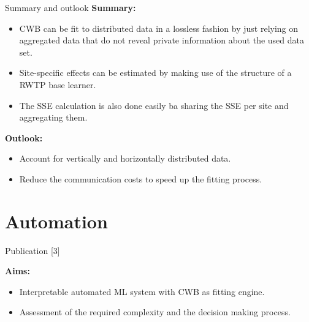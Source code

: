 \documentclass[t,10pt]{beamer}
\begin{document}
\begin{frame}{Summary and outlook}
  \textbf{Summary:}
  \begin{itemize}
    \item
      CWB can be fit to distributed data in a lossless fashion by just relying on aggregated data that do not reveal private information about the used data set.
    \item
      Site-specific effects can be estimated by making use of the structure of a RWTP base learner.
    \item
      The SSE calculation is also done easily ba sharing the SSE per site and aggregating them.
  \end{itemize}
  \textbf{Outlook:}
  \begin{itemize}
    \item Account for vertically and horizontally distributed data.
    \item Reduce the communication costs to speed up the fitting process.
  \end{itemize}
\end{frame}





\section{Automation}

\begin{frame}{Publication [3]}
  \vspace{-0.2cm}
  \begin{figure}
    \centering
  \end{figure}
  \vspace{-0.4cm}

  \textbf{Aims:}
  \begin{itemize}
    \item
      Interpretable automated ML system with CWB as fitting engine.
    \item
      Assessment of the required complexity and the decision making process.
  \end{itemize}
\end{frame}
\end{document}
